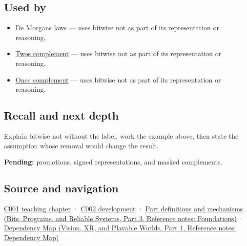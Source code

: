 \subsection{Used by}\label{appendix-8f38927cfc54-used-by}

\hypertarget{appendix-8f38927cfc54-used-by}{}

\begin{itemize}
\tightlist
\item
  \hyperref[appendix-9079d3659da4]{De Morgan\textquotesingle s laws} --- uses bitwise not as part of its representation or reasoning.
\item
  \hyperref[appendix-4fbc03d20829]{Two\textquotesingle s complement} --- uses bitwise not as part of its representation or reasoning.
\item
  \hyperref[appendix-03c678cd40b3]{One\textquotesingle s complement} --- uses bitwise not as part of its representation or reasoning.
\end{itemize}

\subsection{Recall and next depth}\label{appendix-8f38927cfc54-recall-and-next-depth}

\hypertarget{appendix-8f38927cfc54-recall-and-next-depth}{}

Explain bitwise not without the label, work the example above, then state the assumption whose removal would change the result.

\textbf{Pending:} promotions, signed representations, and masked complements.

\subsection{Source and navigation}\label{appendix-8f38927cfc54-source-and-navigation}

\hypertarget{appendix-8f38927cfc54-source-and-navigation}{}

\hyperref[01-foundations-i-ch001-from-a-signal-to-an-interpretation]{C001 teaching chapter} · \hyperref[01-foundations-i-ch001-arithmetic-becomes-a-policy]{C002 development} · \href{../01-Bits-Programs-and-Reliable-Systems-P03/main.pdf\#appendix-fd090d982a15}{Part definitions and mechanisms (Bits, Programs, and Reliable Systems, Part 3, Reference notes: Foundations)} · \href{../07-Vision-XR-and-Playable-Worlds-P01/main.pdf\#appendix-4ad47bdd269a}{Dependency Map (Vision, XR, and Playable Worlds, Part 1, Reference notes: Dependency Map)}

